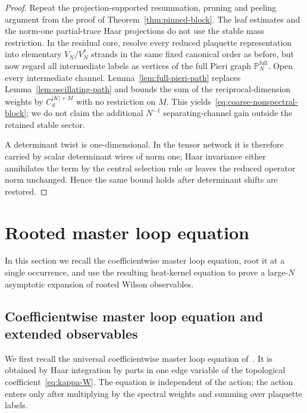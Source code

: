 \documentclass[11pt,a4paper,reqno]{amsart}
\theoremstyle{definition}
\theoremstyle{remark}
\begin{document}
\begin{proof}
Repeat the projection-supported resummation, pruning and peeling argument from the proof of Theorem~\ref{thm:pinned-block}.  The leaf estimates and the norm-one partial-trace Haar projections do not use the stable mass restriction.  In the residual core, resolve every reduced plaquette representation into elementary $V_N/V_N^*$ strands in the same fixed canonical order as before, but now regard all intermediate labels as vertices of the full Pieri graph $\mathbb P_N^{\mathrm{full}}$.  Open every intermediate channel.  Lemma~\ref{lem:full-pieri-path} replaces Lemma~\ref{lem:oscillating-path} and bounds the sum of the reciprocal-dimension weights by $C_d^{|K|+M}$ with no restriction on $M$.  This yields~\eqref{eq:coarse-nonspectral-block}; we do not claim the additional $N^{-1}$ separating-channel gain outside the retained stable sector.

A determinant twist is one-dimensional.  In the tensor network it is therefore carried by scalar determinant wires of norm one; Haar invariance either annihilates the term by the central selection rule or leaves the reduced operator norm unchanged.  Hence the same bound holds after determinant shifts are restored.
\end{proof}

\section{Rooted master loop equation}\label{sec:rooted-master-loop}

In this section we recall the coefficientwise master loop equation, root it at a single occurrence, and use the resulting heat-kernel equation to prove a large-$N$ asymptotic expansion of rooted Wilson observables.
\subsection{Coefficientwise master loop equation and extended observables}\label{subsec:coeff-MLE}

We first recall the universal coefficientwise master loop equation of~\cite{Lem26a}.  It is obtained by Haar integration by parts in one edge variable of the topological coefficient~\eqref{eq:kappa-W}.  The equation is independent of the action; the action enters only after multiplying by the spectral weights and summing over plaquette labels.
\end{document}
